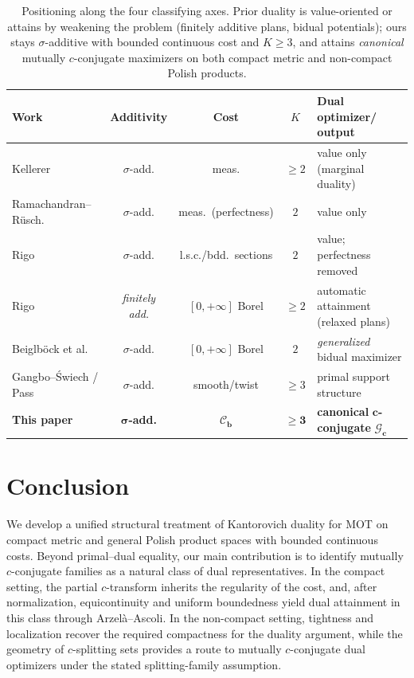 \documentclass[twoside,11pt,a4paper]{article}
\begin{document}
\begin{table}[htbp]
\centering
\small
\setlength{\tabcolsep}{5pt}
\renewcommand{\arraystretch}{1.25}
\begin{tabular}{@{}lcccl@{}}
\toprule
\textbf{Work} & \textbf{Additivity} & \textbf{Cost} & \textbf{$K$} &
\textbf{Dual optimizer/ output} \\
\midrule
Kellerer~\cite{kellerer} & $\sigma$-add. & meas. & $\ge2$ &
value only (marginal duality) \\
Ramachandran--R\"usch.~\cite{Ramachandran} & $\sigma$-add. & meas.\ (perfectness) & $2$ &
value only \\
Rigo~\cite{Rigo} & $\sigma$-add. & l.s.c./bdd.\ sections & $2$ &
value; perfectness removed \\
Rigo~\cite{Rigo2} & \emph{finitely add.} & $[0,+\infty]$ Borel & $\ge2$ &
automatic attainment (relaxed plans) \\
Beiglb\"ock et al.~\cite{Beiglb} & $\sigma$-add. & $[0,+\infty]$ Borel & $2$ &
\emph{generalized} bidual maximizer \\
Gangbo--\'Swiech / Pass~\cite{gangbo1998,pass2015} & $\sigma$-add. & smooth/twist & $\ge3$ &
primal support structure \\
\midrule
\textbf{This paper} & $\boldsymbol{\sigma}$\textbf{-add.} & $\boldsymbol{\mathcal C_b}$ &
$\boldsymbol{\ge3}$ & \textbf{canonical }$\boldsymbol{c}$\textbf{-conjugate }$\boldsymbol{\mathcal G_c}$ \\
\bottomrule
\end{tabular}
\caption{Positioning along the four classifying axes. Prior duality is
value-oriented or attains by weakening the problem (finitely additive plans,
bidual potentials); ours stays $\sigma$-additive with bounded continuous cost and
$K\ge3$, and attains \emph{canonical} mutually $c$-conjugate maximizers on both
compact metric and non-compact Polish products.}
\label{tab:related}
\end{table}








\section{Conclusion}\label{conc}








We develop a unified structural treatment of Kantorovich duality for MOT on compact metric and general Polish product spaces with bounded continuous costs. Beyond primal--dual equality, our main contribution is to identify mutually \(c\)-conjugate families as a natural class of dual representatives. In the compact setting, the partial \(c\)-transform inherits the regularity of the cost, and, after normalization, equicontinuity and uniform boundedness yield dual attainment in this class through Arzelà--Ascoli. In the non-compact setting, tightness and localization recover the required compactness for the duality argument, while the geometry of \(c\)-splitting sets provides a route to mutually \(c\)-conjugate dual optimizers under the stated splitting-family assumption. 
\end{document}
